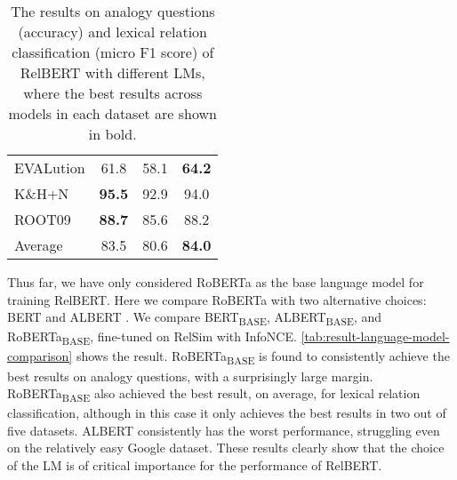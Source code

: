 \documentclass[3p]{elsarticle}
\begin{document}
{\begin{table}[t]
\begin{tabular}{lccc}
EVALution                                & 61.8                      & 58.1                        & \textbf{64.2}                         \\
K\&H+N                                    & \textbf{95.5}                      & 92.9                        & 94.0                         \\
ROOT09                                   & \textbf{88.7}                      & 85.6                        & 88.2                         \\ \midrule
Average                                  & 83.5                      & 80.6                        & \textbf{84.0}                        \\
\bottomrule
\end{tabular}
\caption{The results on analogy questions (accuracy) and lexical relation classification (micro F1 score) of RelBERT with different LMs, where the best results across models in each dataset are shown in bold. }
\label{tab:result-language-model-comparison}
\end{table}
Thus far, we have only considered RoBERTa as the base language model for training RelBERT. Here we compare RoBERTa with two alternative choices: BERT \cite{devlin-etal-2019-bert} and ALBERT \cite{lan2019albert}. We compare BERT\textsubscript{BASE}, ALBERT\textsubscript{BASE}, and RoBERTa\textsubscript{BASE}, fine-tuned on RelSim with InfoNCE. \autoref{tab:result-language-model-comparison} shows the result. RoBERTa\textsubscript{BASE} is found to consistently achieve the best results on analogy questions, with a surprisingly large margin. 
RoBERTa\textsubscript{BASE} also achieved the best result, on average, for lexical relation classification, although in this case it only achieves the best results in two out of five datasets. ALBERT consistently has the worst performance, struggling even on the relatively easy Google dataset. These results clearly show that the choice of the LM is of critical importance for the performance of RelBERT.

}
\end{document}
